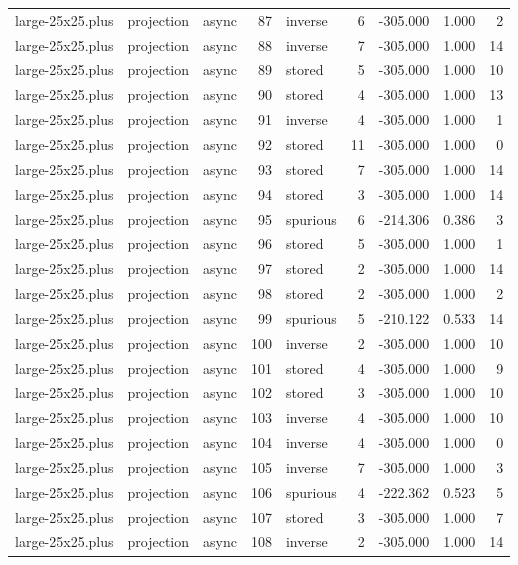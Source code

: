 \begin{tabular}{lllrlrrrr}
large-25x25.plus & projection & async & 87 & inverse & 6 & -305.000 & 1.000 & 2 \\
large-25x25.plus & projection & async & 88 & inverse & 7 & -305.000 & 1.000 & 14 \\
large-25x25.plus & projection & async & 89 & stored & 5 & -305.000 & 1.000 & 10 \\
large-25x25.plus & projection & async & 90 & stored & 4 & -305.000 & 1.000 & 13 \\
large-25x25.plus & projection & async & 91 & inverse & 4 & -305.000 & 1.000 & 1 \\
large-25x25.plus & projection & async & 92 & stored & 11 & -305.000 & 1.000 & 0 \\
large-25x25.plus & projection & async & 93 & stored & 7 & -305.000 & 1.000 & 14 \\
large-25x25.plus & projection & async & 94 & stored & 3 & -305.000 & 1.000 & 14 \\
large-25x25.plus & projection & async & 95 & spurious & 6 & -214.306 & 0.386 & 3 \\
large-25x25.plus & projection & async & 96 & stored & 5 & -305.000 & 1.000 & 1 \\
large-25x25.plus & projection & async & 97 & stored & 2 & -305.000 & 1.000 & 14 \\
large-25x25.plus & projection & async & 98 & stored & 2 & -305.000 & 1.000 & 2 \\
large-25x25.plus & projection & async & 99 & spurious & 5 & -210.122 & 0.533 & 14 \\
large-25x25.plus & projection & async & 100 & inverse & 2 & -305.000 & 1.000 & 10 \\
large-25x25.plus & projection & async & 101 & stored & 4 & -305.000 & 1.000 & 9 \\
large-25x25.plus & projection & async & 102 & stored & 3 & -305.000 & 1.000 & 10 \\
large-25x25.plus & projection & async & 103 & inverse & 4 & -305.000 & 1.000 & 10 \\
large-25x25.plus & projection & async & 104 & inverse & 4 & -305.000 & 1.000 & 0 \\
large-25x25.plus & projection & async & 105 & inverse & 7 & -305.000 & 1.000 & 3 \\
large-25x25.plus & projection & async & 106 & spurious & 4 & -222.362 & 0.523 & 5 \\
large-25x25.plus & projection & async & 107 & stored & 3 & -305.000 & 1.000 & 7 \\
large-25x25.plus & projection & async & 108 & inverse & 2 & -305.000 & 1.000 & 14 \\

\end{tabular}
